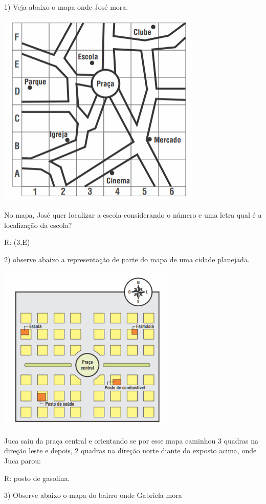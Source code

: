 1) Veja abaixo o mapa onde José mora.

\includegraphics[width=3.86042in,height=3.68611in]{./imgSAEB_6_MAT/media/image64.png}

No mapa, José quer localizar a escola considerando o número e uma letra
qual é a localização da escola?

R: (3,E)

2) observe abaixo a representação de parte do mapa de uma cidade
planejada.

\includegraphics[width=3.39535in,height=3.14326in]{./imgSAEB_6_MAT/media/image65.png}

Juca saiu da praça central e orientando se por esse mapa caminhou 3
quadras na direção leste e depois, 2 quadras na direção norte diante do
exposto acima, onde Juca parou:

R: posto de gasolina.

3) Observe abaixo o mapa do bairro onde Gabriela mora

